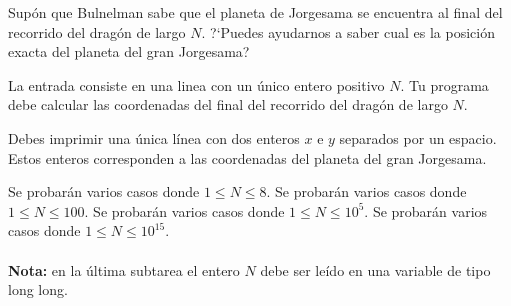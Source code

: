 \documentclass{oci}
\begin{document}
Supón que Bulnelman sabe que el planeta de Jorgesama se encuentra al final del recorrido del dragón de largo $N$.
?`Puedes ayudarnos a saber cual es la posición exacta del planeta del gran Jorgesama?


\begin{inputDescription}
La entrada consiste en una linea con un único entero positivo $N$.
Tu programa debe calcular las coordenadas del final del recorrido del dragón de largo $N$.
\end{inputDescription}

\begin{outputDescription}
Debes imprimir una única línea con dos enteros $x$ e $y$ separados por un espacio.
Estos enteros corresponden a las coordenadas del planeta del gran Jorgesama.
\end{outputDescription}

\begin{scoreDescription}
 Se probarán varios casos donde $1 \leq N \leq 8$.
 Se probarán varios casos donde $1 \leq N \leq 100$.
 Se probarán varios casos donde $1 \leq N \leq 10^5$.
 Se probarán varios casos donde $1 \leq N \leq 10^{15}$. 
\\
\\
{\bf Nota:} en la última subtarea el entero $N$ debe ser leído en una variable de tipo long long.
\end{scoreDescription}

\begin{sampleDescription}
\end{sampleDescription}
\end{document}
